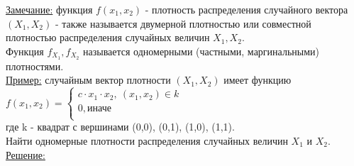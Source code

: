 \underline{Замечание:} 
функция $f(x_1, x_2)$ - плотность распределения случайного вектора $(X_1, X_2)$ - также называется двумерной плотностью или совместной плотностью распределения случайных величин $X_1, X_2$. \\
Функция $f_{X_1}, f_{X_2}$ называется одномерными (частными, маргинальными) плотностями. \\


\underline{Пример:} случайным вектор плотности $(X_1, X_2)$ имеет функцию \\
$f(x_1, x_2) = 
\begin{cases}
	c \cdot x_1 \cdot x_2, \ (x_1, x_2) \in k \\
	0, \text{иначе} \\
\end{cases}$ \\
где k - квадрат с вершинами (0,0), (0,1), (1,0), (1,1). \\
Найти одномерные плотности распределения случайных величин $X_1$ и $X_2$. \\
\underline{Решение:} 
